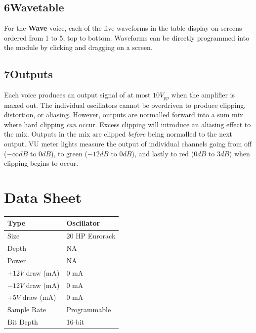 \documentclass[12pt,letter]{article}
\begin{document}
\subsection*{6{\quad}Wavetable}

For the \textbf{Wave} voice, each of the five waveforms in the table display on screens ordered from 1 to 5, top to bottom. Waveforms can be directly programmed into the module by clicking and dragging on a screen.

\subsection*{7{\quad}Outputs}

Each voice produces an output signal of at most $10V_{pp}$ when the amplifier is maxed out. The individual oscillators cannot be overdriven to produce clipping, distortion, or aliasing. However, outputs are normalled forward into a sum mix where hard clipping \textit{can} occur. Excess clipping will introduce an aliasing effect to the mix. Outputs in the mix are clipped \textit{before} being normalled to the next output. VU meter lights measure the output of individual channels going from off ($-\infty dB$ to $0dB$), to green ($-12dB$ to $0dB$), and lastly to red ($0dB$ to $3dB$) when clipping begins to occur.


\clearpage
\section*{Data Sheet}

\begin{table}[!htp]
\begin{tabular}{|l|l|}
\hline
Type             & Oscillator               \\
\hline
Size             & 20 HP Eurorack           \\
\hline
Depth            & NA                       \\
\hline
Power            & NA                       \\ %
\hline
$+12V$ draw (mA) & 0 mA                     \\
\hline
$-12V$ draw (mA) & 0 mA                     \\
\hline
$+5V$ draw (mA)  & 0 mA                     \\
\hline
Sample Rate      & Programmable             \\
\hline
Bit Depth        & 16-bit                   \\
\hline
\end{tabular}
\end{table}


\clearpage
\renewcommand\refname{References \& Acknowledgments}
\nocite{*}


\end{document}

